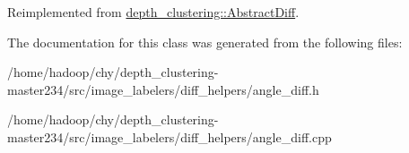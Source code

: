 Reimplemented from \hyperlink{classdepth__clustering_1_1AbstractDiff_a5500c82f3e6800922ba6fc6c22c6d0bf}{depth\-\_\-clustering\-::\-Abstract\-Diff}.



The documentation for this class was generated from the following files\-:\begin{DoxyCompactItemize}
\item 
/home/hadoop/chy/depth\-\_\-clustering-\/master234/src/image\-\_\-labelers/diff\-\_\-helpers/angle\-\_\-diff.\-h\item 
/home/hadoop/chy/depth\-\_\-clustering-\/master234/src/image\-\_\-labelers/diff\-\_\-helpers/angle\-\_\-diff.\-cpp\end{DoxyCompactItemize}
